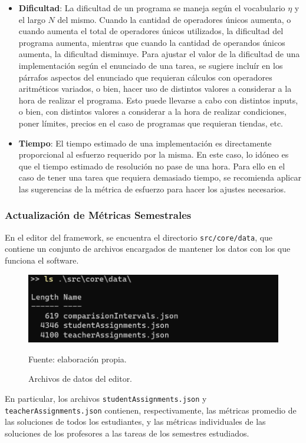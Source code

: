 \documentclass[letterpaper,12pt]{article}
\begin{document}
\begin{itemize}
  \item \textbf{Dificultad}: La dificultad de un programa se maneja según el vocabulario $\eta$ y el largo $N$ del mismo. Cuando la cantidad de operadores únicos aumenta, o cuando aumenta el total de operadores únicos utilizados, la dificultad del programa aumenta, mientras que cuando la cantidad de operandos únicos aumenta, la dificultad disminuye. Para ajustar el valor de la dificultad de una implementación según el enunciado de una tarea, se sugiere incluír en los párrafos aspectos del enunciado que requieran cálculos con operadores aritméticos variados, o bien, hacer uso de distintos valores a considerar a la hora de realizar el programa. Esto puede llevarse a cabo con distintos inputs, o bien, con distintos valores a considerar a la hora de realizar condiciones, poner límites, precios en el caso de programas que requieran tiendas, etc.
  \item \textbf{Tiempo}: El tiempo estimado de una implementación es directamente proporcional al esfuerzo requerido por la misma. En este caso, lo idóneo es que el tiempo estimado de resolución no pase de una hora. Para ello en el caso de tener una tarea que requiera demasiado tiempo, se recomienda aplicar las sugerencias de la métrica de esfuerzo para hacer los ajustes necesarios.
\end{itemize}

\subsubsection{Actualización de Métricas Semestrales} \label{sssec:metricsUpdate}

En el editor del framework, se encuentra el directorio \texttt{src/core/data}, que contiene un conjunto de archivos encargados de mantener los datos con los que funciona el software.
\begin{figure}[H]
  \centering
  \includegraphics[width=1\textwidth]{figures/datafiles.png}
  \caption{Archivos de datos del editor.} Fuente: elaboración propia.
  \label{datafiles}
\end{figure}
En particular, los archivos \texttt{studentAssignments.json} y \texttt{teacherAssignments.json} contienen, respectivamente, las métricas promedio de las soluciones de todos los estudiantes, y las métricas individuales de las soluciones de los profesores a las tareas de los semestres estudiados.
\end{document}
